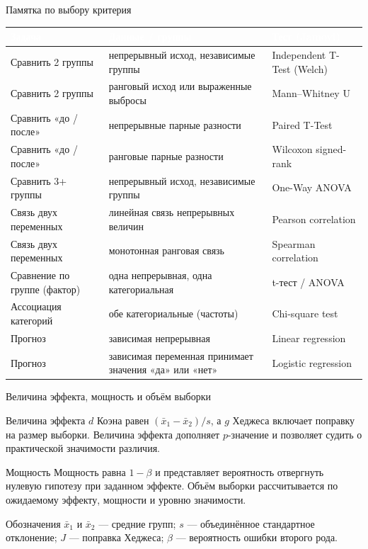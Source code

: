 \documentclass[aspectratio=169]{beamer}
\begin{document}
\begin{frame}{Памятка по выбору критерия}
  \centering
  \scriptsize
  \renewcommand{\arraystretch}{0.9}
  \begin{tabular}{@{}p{3.4cm}p{3.4cm}p{4.6cm}@{}}
    \toprule
    \rowcolor{uniblue}
    \textcolor{white}{\textbf{Задача}} & \textcolor{white}{\textbf{Данные / группы}} & \textcolor{white}{\textbf{Тест (Jamovi)}}\\
    \midrule
    Сравнить 2 группы & непрерывный исход, независимые группы & Independent T-Test (Welch)\\
    \rowcolor{unilightblue!50}
    Сравнить 2 группы & ранговый исход или выраженные выбросы & Mann--Whitney U\\
    Сравнить «до / после» & непрерывные парные разности & Paired T-Test\\
    \rowcolor{unilightblue!50}
    Сравнить «до / после» & ранговые парные разности & Wilcoxon signed-rank\\
    Сравнить 3+ группы & непрерывный исход, независимые группы & One-Way ANOVA\\
    \rowcolor{unilightblue!50}
    Связь двух переменных & линейная связь непрерывных величин & Pearson correlation\\
    Связь двух переменных & монотонная ранговая связь & Spearman correlation\\
    \rowcolor{unilightblue!50}
    Сравнение по группе (фактор) & одна непрерывная, одна категориальная & t-тест / ANOVA\\
    Ассоциация категорий & обе категориальные (частоты) & Chi-square test\\
    \rowcolor{unilightblue!50}
    Прогноз & зависимая непрерывная & Linear regression\\
    Прогноз & зависимая переменная принимает значения «да» или «нет» & Logistic regression\\
    \bottomrule
  \end{tabular}
\end{frame}

\begin{frame}{Величина эффекта, мощность и объём выборки}
  \begin{block}{Величина эффекта}\footnotesize
    $d$ Коэна равен $(\bar{x}_1-\bar{x}_2)/s$, а $g$ Хеджеса включает поправку на размер выборки. Величина эффекта дополняет $p$-значение и позволяет судить о практической значимости различия.
  \end{block}
  \begin{block}{Мощность}\footnotesize
    Мощность равна $1-\beta$ и представляет вероятность отвергнуть нулевую гипотезу при заданном эффекте. Объём выборки рассчитывается по ожидаемому эффекту, мощности и уровню значимости.
  \end{block}
  \begin{block}{Обозначения}\tiny
    $\bar{x}_1$ и $\bar{x}_2$ — средние групп; $s$ — объединённое стандартное отклонение; $J$ — поправка Хеджеса; $\beta$ — вероятность ошибки второго рода.
  \end{block}
\end{frame}
\end{document}
